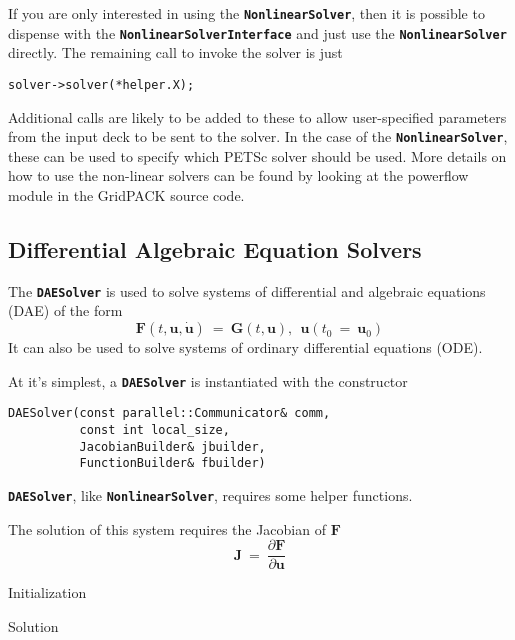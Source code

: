 If you are only interested in using the \texttt{\textbf{NonlinearSolver}}, then it is possible to dispense with the \texttt{\textbf{NonlinearSolverInterface}} and just use the \texttt{\textbf{NonlinearSolver}} directly. The remaining call to invoke the solver is just

{
\color{red}
\begin{Verbatim}[fontseries=b]
  solver->solver(*helper.X);
\end{Verbatim}
}

Additional calls are likely to be added to these to allow user-specified parameters from the input deck to be sent to the solver. In the case of the \texttt{\textbf{NonlinearSolver}}, these can be used to specify which PETSc solver should be used. More details on how to use the non-linear solvers can be found by looking at the powerflow module in the GridPACK source code.


\subsection{Differential Algebraic Equation Solvers}
\label{sec:dae-solver}

The \texttt{\textbf{DAESolver}} is used to solve systems of
differential and algebraic equations (DAE) of the form
\begin{equation}
  \mathbf{F} \left( t, \mathbf{u}, \mathbf{\dot{u}} \right) ~=~ \mathbf{G} \left( t,
    \mathbf{u} \right), ~~ \mathbf{u} \left( t_{0} ~ = ~ \mathbf{u}_{0}
  \right)
\end{equation}
It can also be used to solve systems of ordinary differential equations (ODE).

At it's simplest, a \texttt{\textbf{DAESolver}} is instantiated with
the constructor
{
\color{red}
\begin{Verbatim}[fontseries=b]
DAESolver(const parallel::Communicator& comm, 
          const int local_size,
          JacobianBuilder& jbuilder,
          FunctionBuilder& fbuilder)
\end{Verbatim}
}
\texttt{\textbf{DAESolver}}, like \texttt{\textbf{NonlinearSolver}},
requires some helper functions.  

The solution of this system requires the Jacobian of $\mathbf{F}$
\begin{equation}
  \mathbf{J} ~ = ~ \frac{\partial \mathbf{F}}{\partial \mathbf{u}}
\end{equation}

Initialization

Solution


